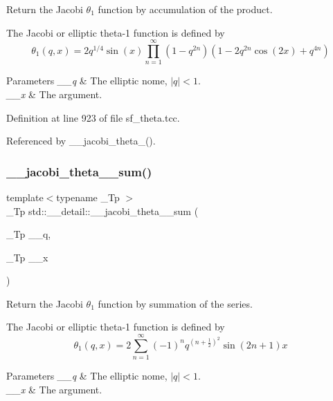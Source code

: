 Return the Jacobi $ \theta_1 $ function by accumulation of the product.

The Jacobi or elliptic theta-\/1 function is defined by \[ \theta_1(q,x) = 2 q^{1/4} \sin(x) \prod_{n=1}^{\infty} (1 - q^{2n})(1 - 2q^{2n}\cos(2x) + q^{4n}) \]


\begin{DoxyParams}{Parameters}
{\em \+\_\+\+\_\+q} & The elliptic nome, $ |q| < 1 $. \\
\hline
{\em \+\_\+\+\_\+x} & The argument. \\
\hline
\end{DoxyParams}


Definition at line 923 of file sf\+\_\+theta.\+tcc.



Referenced by \+\_\+\+\_\+jacobi\+\_\+theta\+\_().

\mbox{\label{namespacestd_1_1____detail_adea964551a6650baebe13574d942bf50}} 
\subsubsection{\texorpdfstring{\+\_\+\+\_\+jacobi\+\_\+theta\+\_\+\_\+sum()}{\_\_jacobi\_theta\_1\_sum()}}
{\footnotesize\ttfamily template$<$typename \+\_\+\+Tp $>$ \\
\+\_\+\+Tp std\+::\+\_\+\+\_\+detail\+::\+\_\+\+\_\+jacobi\+\_\+theta\+\_\+\_\+sum (\begin{DoxyParamCaption}\item[{\+\_\+\+Tp}]{\+\_\+\+\_\+q,  }\item[{\+\_\+\+Tp}]{\+\_\+\+\_\+x }\end{DoxyParamCaption})}

Return the Jacobi $ \theta_1 $ function by summation of the series.

The Jacobi or elliptic theta-\/1 function is defined by \[ \theta_1(q,x) = 2\sum_{n=1}^{\infty}(-1)^n q^{(n+\frac{1}{2})^2}\sin{(2n+1)x} \]


\begin{DoxyParams}{Parameters}
{\em \+\_\+\+\_\+q} & The elliptic nome, $ |q| < 1 $. \\
\hline
{\em \+\_\+\+\_\+x} & The argument. \\
\hline
\end{DoxyParams}


